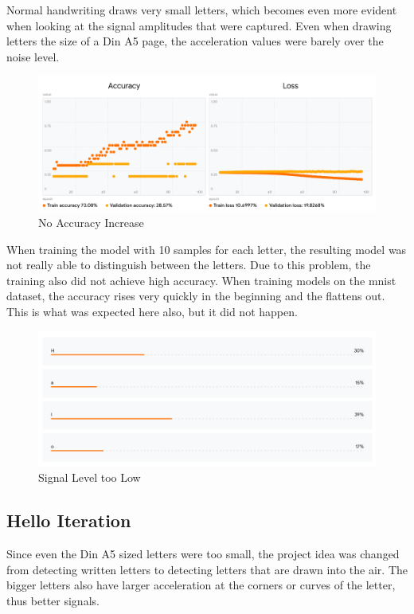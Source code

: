 \documentclass[a4paper,titlepage]{article}
\begin{document}
Normal handwriting draws very small letters, which becomes even more evident when looking at the signal amplitudes that were captured.
Even when drawing letters the size of a Din A5 page, the acceleration values were barely over the noise level.

\begin{figure}[H]
    \includegraphics[width=\textwidth]{slow_training_start.png}
    \caption{No Accuracy Increase}
\end{figure}

When training the model with 10 samples for each letter, the resulting model was not really able to distinguish between the letters.
Due to this problem, the training also did not achieve high accuracy.
When training models on the mnist dataset, the accuracy rises very quickly in the beginning and the flattens out.
This is what was expected here also, but it did not happen.

\begin{figure}[H]
    \includegraphics[width=\textwidth]{uncertain_results.png}
    \caption{Signal Level too Low}
\end{figure}

\subsection{Hello Iteration}

Since even the Din A5 sized letters were too small, the project idea was changed from detecting written letters to detecting letters that are drawn into the air.
The bigger letters also have larger acceleration at the corners or curves of the letter, thus better signals.
\end{document}

